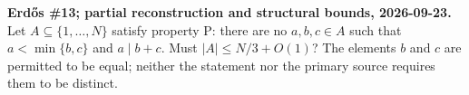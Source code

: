 \textbf{Erd\H{o}s \#13; partial reconstruction and structural bounds, 2026-09-23.}
Let $A\subseteq\{1,\ldots,N\}$ satisfy property P: there are no $a,b,c\in A$ such that $a<\min\{b,c\}$ and $a\mid b+c$. Must $|A|\le N/3+O(1)$? The elements $b$ and $c$ are permitted to be equal; neither the statement nor the primary source requires them to be distinct.
